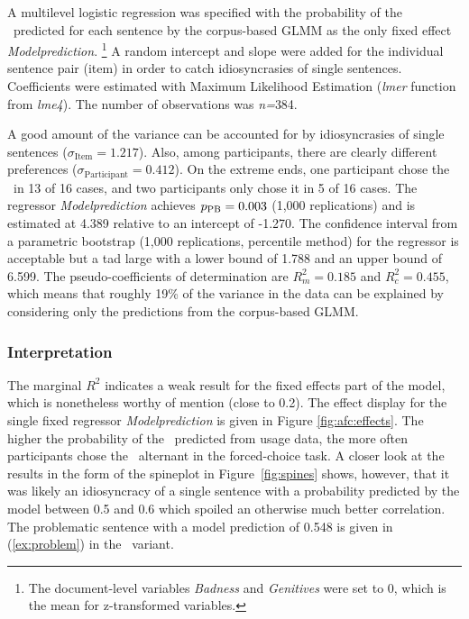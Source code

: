 A multilevel logistic regression was specified with the probability of the \PGCa\ predicted for each sentence by the corpus-based GLMM as the only fixed effect \textit{Modelprediction}.%
\footnote{The document-level variables \textit{Badness} and \textit{Genitives} were set to 0, which is the mean for z-transformed variables.}
A random intercept and slope were added for the individual sentence pair (item) in order to catch idiosyncrasies of single sentences.
Coefficients were estimated with Maximum Likelihood Estimation (\textit{lmer} function from \textit{lme4}).
The number of observations was \textit{n=}384.

A good amount of the variance can be accounted for by idiosyncrasies of single sentences ($\sigma_{\text{Item}}=1.217$).
Also, among participants, there are clearly different preferences ($\sigma_{\text{Participant}}=0.412$).
On the extreme ends, one participant chose the \PGCa\ in 13 of 16 cases, and two participants only chose it in 5 of 16 cases.
The regressor \textit{Modelprediction} achieves $p_{\text{PB}}=0.003$ (1,000 replications) and is estimated at 4.389 relative to an intercept of -1.270.
The confidence interval from a parametric bootstrap (1,000 replications, percentile method) for the regressor is acceptable but a tad large with a lower bound of 1.788 and an upper bound of 6.599.
The pseudo-coefficients of determination are $R^2_{m}=0.185$ and $R^2_{c}=0.455$, which means that roughly 19\% of the variance in the data can be explained by considering only the predictions from the corpus-based GLMM.

\subsubsection{Interpretation}

The marginal $R^2$ indicates a weak result for the fixed effects part of the model, which is nonetheless worthy of mention (close to 0.2).
The effect display for the single fixed regressor \textit{Modelprediction} is given in Figure \ref{fig:afc:effects}.
The higher the probability of the \PGCa\ predicted from usage data, the more often participants chose the \PGCa\ alternant in the forced-choice task.
A closer look at the results in the form of the spineplot in Figure~\ref{fig:spines} shows, however, that it was likely an idiosyncracy of a single sentence with a probability predicted by the model between 0.5 and 0.6 which spoiled an otherwise much better correlation.
The problematic sentence with a model prediction of 0.548 is given in (\ref{ex:problem}) in the \PGCa\ variant.


